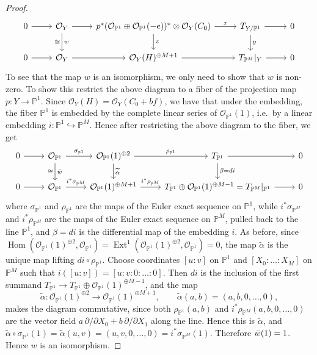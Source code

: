 \documentclass[11pt,reqno]{amsart}
\theoremstyle{plain}
\theoremstyle{definition}
\newcommand{\PP}{\mathbb{P}}
\newcommand{\PM}{\mathbb{P}^M}
\newcommand{\OO}{\mathcal{O}}
\newcommand{\Hom}{\operatorname{Hom}}
\newcommand{\Ext}{\operatorname{Ext}}
\newcommand{\TP}{T_{\PM}|_Y}
\begin{document}
\begin{proof}
\begin{equation}
\begin{tikzcd}
  0 \arrow[r] & \OO_Y \arrow[r] \arrow[d, "w", "\cong"'] & p^*(\OO_{\PP^1} \oplus \OO_{\PP^1}(-e))^* \otimes \OO_Y(C_0) \arrow[r, "x"] \arrow[d, "z"] & T_{Y/\PP^1} \arrow[r] \arrow[d, "y"] & 0 \\
   0 \arrow[r] & \OO_Y \arrow[r] & \OO_Y(H)^{\oplus M+1} \arrow[r] & \TP \arrow[r] & 0
\end{tikzcd}
\end{equation}
To see that the map $w$ is an isomorphism, we only need to show that $w$ is non-zero. To show this restrict the above diagram to a fiber of the projection map $p\colon Y\to\PP^1$. Since $\OO_Y(H)=\OO_Y(C_0+bf)$, we have that under the embedding, the fiber $\PP^1$ is embedded by the complete linear series of $\OO_{\PP^1}(1)$, i.e.\ by a linear embedding $i\colon\PP^1\hookrightarrow\PM$. Hence after restricting the above diagram to the fiber, we get
\[
\begin{tikzcd}
  0 \arrow[r] & \OO_{\PP^1} \arrow[r, "\sigma_{\PP^1}"] \arrow[d, "\Bar{w}", "\cong"'] & \OO_{\PP^1}(1)^{\oplus 2} \arrow[r, "\rho_{\PP^1}"] \arrow[d, "\widetilde{\alpha}"] & T_{\PP^1} \arrow[r] \arrow[d, "\beta = di"] & 0 \\
   0 \arrow[r] & \OO_{\PP^1} \arrow[r, "i^*\sigma_{\PM}"] & \OO_{\PP^1}(1)^{\oplus M+1} \arrow[r, "i^*\rho_{\PM}"] & T_{\PP^1} \oplus \OO_{\PP^1}(1)^{\oplus M-1} = T_{\PM}|_{\PP^1} \arrow[r] & 0
\end{tikzcd}
\]
where $\sigma_{\PP^1}$ and $\rho_{\PP^1}$ are the maps of the Euler exact sequence on $\PP^1$, while $i^*\sigma_{\PM}$ and $i^*\rho_{\PM}$ are the maps of the Euler exact sequence on $\PM$, pulled back to the line $\PP^1$, and $\beta=di$ is the differential map of the embedding $i$. As before, since $\Hom(\OO_{\PP^1}(1)^{\oplus 2},\OO_{\PP^1})=\Ext^1(\OO_{\PP^1}(1)^{\oplus 2},\OO_{\PP^1})=0$, the map $\widetilde{\alpha}$ is the unique map lifting $di\circ\rho_{\PP^1}$. Choose coordinates $[u:v]$ on $\PP^1$ and $[X_0:\dots:X_M]$ on $\PM$ such that $i([u:v])=[u:v:0:\dots:0]$. Then $di$ is the inclusion of the first summand $T_{\PP^1}\to T_{\PP^1}\oplus\OO_{\PP^1}(1)^{\oplus M-1}$, and the map
\[
\widetilde\alpha\colon\OO_{\PP^1}(1)^{\oplus 2}\longrightarrow\OO_{\PP^1}(1)^{\oplus M+1},\qquad \widetilde\alpha(a,b)=(a,b,0,\dots,0),
\]
makes the diagram commutative, since both $\rho_{\PP^1}(a,b)$ and $i^*\rho_{\PM}(a,b,0,\dots,0)$ are the vector field $a\,\partial/\partial X_0+b\,\partial/\partial X_1$ along the line. Hence this is $\widetilde\alpha$, and $\widetilde{\alpha}\circ\sigma_{\PP^1}(1)=\widetilde{\alpha}(u,v)=(u,v,0,\dots,0)=i^*\sigma_{\PM}(1)$. Therefore $\Bar{w}(1)=1$. Hence $w$ is an isomorphism.


\end{proof}
\end{document}
